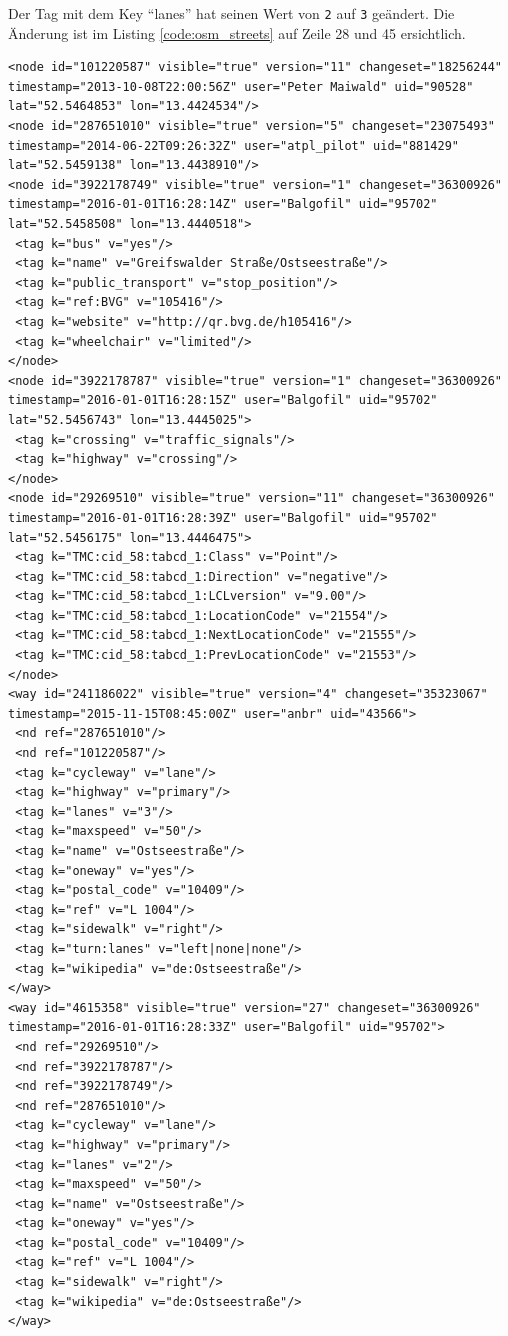 Der Tag mit dem Key ``lanes'' hat seinen Wert von \texttt{2} auf \texttt{3} geändert. Die Änderung ist im Listing \ref{code:osm_streets} auf Zeile 28 und 45 ersichtlich.
\lstset{
  numbers=left,
  numbersep=5pt,
  caption=Vollständige Daten des Straßenabschnitts,
  label=code:osm_streets
}
\begin{lstlisting}
<node id="101220587" visible="true" version="11" changeset="18256244" timestamp="2013-10-08T22:00:56Z" user="Peter Maiwald" uid="90528" lat="52.5464853" lon="13.4424534"/>
<node id="287651010" visible="true" version="5" changeset="23075493" timestamp="2014-06-22T09:26:32Z" user="atpl_pilot" uid="881429" lat="52.5459138" lon="13.4438910"/>
<node id="3922178749" visible="true" version="1" changeset="36300926" timestamp="2016-01-01T16:28:14Z" user="Balgofil" uid="95702" lat="52.5458508" lon="13.4440518">
 <tag k="bus" v="yes"/>
 <tag k="name" v="Greifswalder Straße/Ostseestraße"/>
 <tag k="public_transport" v="stop_position"/>
 <tag k="ref:BVG" v="105416"/>
 <tag k="website" v="http://qr.bvg.de/h105416"/>
 <tag k="wheelchair" v="limited"/>
</node>
<node id="3922178787" visible="true" version="1" changeset="36300926" timestamp="2016-01-01T16:28:15Z" user="Balgofil" uid="95702" lat="52.5456743" lon="13.4445025">
 <tag k="crossing" v="traffic_signals"/>
 <tag k="highway" v="crossing"/>
</node>
<node id="29269510" visible="true" version="11" changeset="36300926" timestamp="2016-01-01T16:28:39Z" user="Balgofil" uid="95702" lat="52.5456175" lon="13.4446475">
 <tag k="TMC:cid_58:tabcd_1:Class" v="Point"/>
 <tag k="TMC:cid_58:tabcd_1:Direction" v="negative"/>
 <tag k="TMC:cid_58:tabcd_1:LCLversion" v="9.00"/>
 <tag k="TMC:cid_58:tabcd_1:LocationCode" v="21554"/>
 <tag k="TMC:cid_58:tabcd_1:NextLocationCode" v="21555"/>
 <tag k="TMC:cid_58:tabcd_1:PrevLocationCode" v="21553"/>
</node>
<way id="241186022" visible="true" version="4" changeset="35323067" timestamp="2015-11-15T08:45:00Z" user="anbr" uid="43566">
 <nd ref="287651010"/>
 <nd ref="101220587"/>
 <tag k="cycleway" v="lane"/>
 <tag k="highway" v="primary"/>
 <tag k="lanes" v="3"/>
 <tag k="maxspeed" v="50"/>
 <tag k="name" v="Ostseestraße"/>
 <tag k="oneway" v="yes"/>
 <tag k="postal_code" v="10409"/>
 <tag k="ref" v="L 1004"/>
 <tag k="sidewalk" v="right"/>
 <tag k="turn:lanes" v="left|none|none"/>
 <tag k="wikipedia" v="de:Ostseestraße"/>
</way>
<way id="4615358" visible="true" version="27" changeset="36300926" timestamp="2016-01-01T16:28:33Z" user="Balgofil" uid="95702">
 <nd ref="29269510"/>
 <nd ref="3922178787"/>
 <nd ref="3922178749"/>
 <nd ref="287651010"/>
 <tag k="cycleway" v="lane"/>
 <tag k="highway" v="primary"/>
 <tag k="lanes" v="2"/>
 <tag k="maxspeed" v="50"/>
 <tag k="name" v="Ostseestraße"/>
 <tag k="oneway" v="yes"/>
 <tag k="postal_code" v="10409"/>
 <tag k="ref" v="L 1004"/>
 <tag k="sidewalk" v="right"/>
 <tag k="wikipedia" v="de:Ostseestraße"/>
</way>
\end{lstlisting}
\lstset{
  numbers=none,
  caption=,
  label=
  }
  
